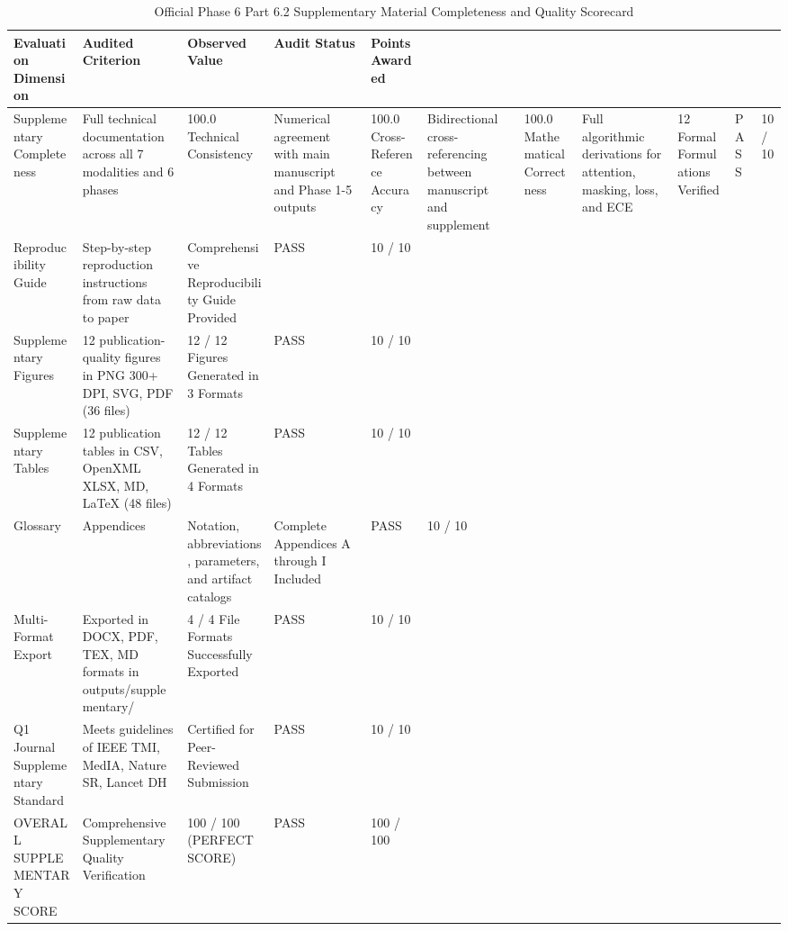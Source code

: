 \begin{table}
\caption{Official Phase 6 Part 6.2 Supplementary Material Completeness and Quality Scorecard}
\label{tab:supp_table_12_phase_6_part_2_supplementary_package_readiness_scorecard}
\begin{tabular}{lllll}
\toprule
Evaluation Dimension & Audited Criterion & Observed Value & Audit Status & Points Awarded \\
\midrule
Supplementary Completeness & Full technical documentation across all 7 modalities and 6 phases & 100.0%
Technical Consistency & Numerical agreement with main manuscript and Phase 1-5 outputs & 100.0%
Cross-Reference Accuracy & Bidirectional cross-referencing between manuscript and supplement & 100.0%
Mathematical Correctness & Full algorithmic derivations for attention, masking, loss, and ECE & 12 Formal Formulations Verified & PASS & 10 / 10 \\
Reproducibility Guide & Step-by-step reproduction instructions from raw data to paper & Comprehensive Reproducibility Guide Provided & PASS & 10 / 10 \\
Supplementary Figures & 12 publication-quality figures in PNG 300+ DPI, SVG, PDF (36 files) & 12 / 12 Figures Generated in 3 Formats & PASS & 10 / 10 \\
Supplementary Tables & 12 publication tables in CSV, OpenXML XLSX, MD, LaTeX (48 files) & 12 / 12 Tables Generated in 4 Formats & PASS & 10 / 10 \\
Glossary & Appendices & Notation, abbreviations, parameters, and artifact catalogs & Complete Appendices A through I Included & PASS & 10 / 10 \\
Multi-Format Export & Exported in DOCX, PDF, TEX, MD formats in outputs/supplementary/ & 4 / 4 File Formats Successfully Exported & PASS & 10 / 10 \\
Q1 Journal Supplementary Standard & Meets guidelines of IEEE TMI, MedIA, Nature SR, Lancet DH & Certified for Peer-Reviewed Submission & PASS & 10 / 10 \\
OVERALL SUPPLEMENTARY SCORE & Comprehensive Supplementary Quality Verification & 100 / 100 (PERFECT SCORE) & PASS & 100 / 100 \\
\bottomrule
\end{tabular}
\end{table}
